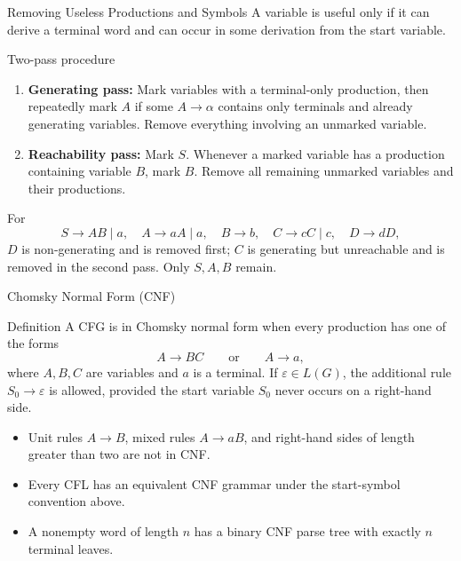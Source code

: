 \documentclass[10pt]{beamer}
\begin{document}
\begin{frame}{Removing Useless Productions and Symbols}
  \small
  A variable is useful only if it can derive a terminal word and can occur in
  some derivation from the start variable.
  \begin{block}{Two-pass procedure}
    \begin{enumerate}
      \item \textbf{Generating pass:} Mark variables with a terminal-only
        production, then repeatedly mark $A$ if some $A\to\alpha$ contains
        only terminals and already generating variables. Remove everything
        involving an unmarked variable.
      \item \textbf{Reachability pass:} Mark $S$. Whenever a marked variable
        has a production containing variable $B$, mark $B$. Remove all
        remaining unmarked variables and their productions.
    \end{enumerate}
  \end{block}
  For
  \[
    S\to AB\mid a,\quad A\to aA\mid a,\quad B\to b,\quad
    C\to cC\mid c,\quad D\to dD,
  \]
  $D$ is non-generating and is removed first; $C$ is generating but
  unreachable and is removed in the second pass. Only $S,A,B$ remain.
\end{frame}

\begin{frame}{Chomsky Normal Form (CNF)}
  \small
  \begin{block}{Definition}
    A CFG is in Chomsky normal form when every production has one of the forms
    \[
      A\to BC
      \qquad\text{or}\qquad
      A\to a,
    \]
    where $A,B,C$ are variables and $a$ is a terminal. If
    $\varepsilon\in L(G)$, the additional rule $S_0\to\varepsilon$ is allowed,
    provided the start variable $S_0$ never occurs on a right-hand side.
  \end{block}
  \pause
  \begin{itemize}
    \item Unit rules $A\to B$, mixed rules $A\to aB$, and right-hand sides of
      length greater than two are not in CNF.
    \item Every CFL has an equivalent CNF grammar under the start-symbol
      convention above.
    \item A nonempty word of length $n$ has a binary CNF parse tree with
      exactly $n$ terminal leaves.
  \end{itemize}
\end{frame}
\end{document}
